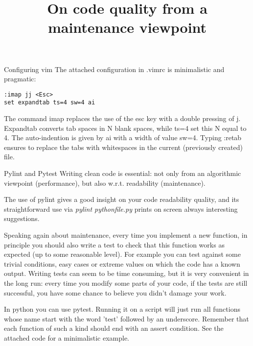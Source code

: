 \documentclass[10pt]{article}
\title {On code quality from a maintenance viewpoint}
\begin{document}
\maketitle


\begin{section}{Configuring vim}
The attached configuration in .vimrc is minimalistic and pragmatic:

\begin{lstlisting}
:imap jj <Esc>
set expandtab ts=4 sw=4 ai
\end{lstlisting}


The command imap replaces the use of the esc key with a double pressing of j.
Expandtab converts tab spaces in N blank spaces, while ts=4 set this N equal
to 4. The auto-indention is given by ai with a width of value sw=4.
Typing :retab ensures to replace
the tabs with whitespaces in the current (previously created) file.
\end{section}


\begin{section}{Pylint and Pytest}
Writing clean code is essential: not only from an algorithmic viewpoint 
(performance), but also w.r.t. readability (maintenance).


The use of pylint gives a good insight on your code readability quality,
and its straightforward use via \emph{pylint pythonfile.py}
prints on screen always interesting suggestions.


Speaking again about maintenance, every time you implement a new function, 
in principle you should also
write a test to check that this function works as expected 
(up to some reasonable level).
For example you can test against some trivial conditions, easy
cases or extreme values on which the code has a known output.
Writing tests can seem to be time consuming, but it is
very convenient in the long run: every time you modify some parts of your code,
if the tests are still successful, you have some chance to believe you didn't
damage your work.


In python you can use pytest. Running it on a script will just run
all functions whose name start with the word 'test' followed by an underscore.
Remember that each function of such a kind should end with an assert condition.
See the attached code for a minimalistic example.
\end{section}
\end{document}
